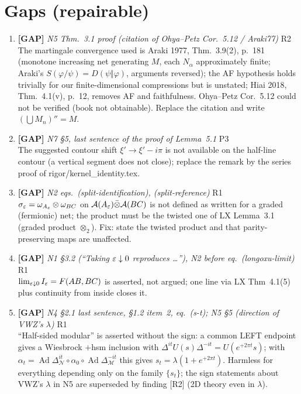 \documentclass[11pt]{article}
\begin{document}
\section{Gaps (repairable)}
\begin{enumerate}[leftmargin=1.6em,itemsep=6pt]
\item \textbf{[GAP]} \emph{N5 Thm.~3.1 proof (citation of Ohya--Petz Cor.~5.12 / Araki77)} \hfill\textsc{R2}\\ The martingale convergence used is Araki 1977, Thm.~3.9(2), p.~181 (monotone increasing net generating \(M\), each \(N_\alpha\) approximately finite; Araki's \(S(\varphi/\psi)=D(\psi\Vert\varphi)\), arguments reversed); the AF hypothesis holds trivially for our finite-dimensional compressions but is unstated; Hiai 2018, Thm.~4.1(v), p.~12, removes AF and faithfulness. Ohya--Petz Cor.~5.12 could not be verified (book not obtainable). Replace the citation and write \((\bigcup M_n)''=M\).
\item \textbf{[GAP]} \emph{N7 \S5, last sentence of the proof of Lemma~5.1} \hfill\textsc{P3}\\ The suggested contour shift \(\xi'\to\xi'-i\pi\) is not available on the half-line contour (a vertical segment does not close); replace the remark by the series proof of rigor/kernel\_identity.tex.
\item \textbf{[GAP]} \emph{N2 eqs.\ (split-identification), (split-reference)} \hfill\textsc{R1}\\ \(\sigma_\varepsilon=\omega_{A_\varepsilon}\otimes\omega_{BC}\) on \(\mathcal A(A_\varepsilon)\bar\otimes\mathcal A(BC)\) is not defined as written for a graded (fermionic) net; the product must be the twisted one of LX Lemma~3.1 (graded product \(\otimes_2\)). Fix: state the twisted product and that parity-preserving maps are unaffected.
\item \textbf{[GAP]} \emph{N1 \S3.2 (``Taking \(\varepsilon\downarrow0\) reproduces \dots''), N2 before eq.\ (longoxu-limit)} \hfill\textsc{R1}\\ \(\lim_{\varepsilon\downarrow0}I_\varepsilon=F(AB,BC)\) is asserted, not argued; one line via LX Thm~4.1(5) plus continuity from inside closes it.
\item \textbf{[GAP]} \emph{N4 \S2.1 last sentence, \S1.2 item~2, eq.\ (s-t); N5 \S5 (direction of VWZ's \(\lambda\))} \hfill\textsc{R1}\\ ``Half-sided modular'' is asserted without the sign: a common LEFT endpoint gives a Wiesbrock \(+\)hsm inclusion with \(\Delta^{it}U(s)\Delta^{-it}=U(e^{+2\pi t}s)\); with \(\alpha_t=\operatorname{Ad}\Delta_{\mathcal N}^{it}\circ\alpha_0\circ\operatorname{Ad}\Delta_{\mathcal M}^{-it}\) this gives \(s_t=\lambda(1+e^{+2\pi t})\). Harmless for everything depending only on the family \(\{s_t\}\); the sign statements about VWZ's \(\lambda\) in N5 are superseded by finding [R2] (2D theory even in \(\lambda\)).

\end{enumerate}
\end{document}
